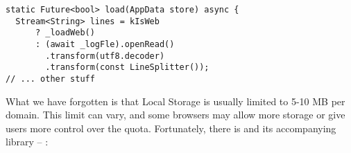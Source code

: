 
\begin{lstlisting}[firstnumber=29]
static Future<bool> load(AppData store) async {
  Stream<String> lines = kIsWeb
      ? _loadWeb()
      : (await _logFle).openRead()
        .transform(utf8.decoder)
        .transform(const LineSplitter());
// ... other stuff
\end{lstlisting}

\noindent What we have forgotten is that Local Storage is usually limited to 5-10 MB per domain. This limit can vary, 
and some browsers may allow more storage or give users more control over the quota. Fortunately, there is  
and its accompanying library -- :

